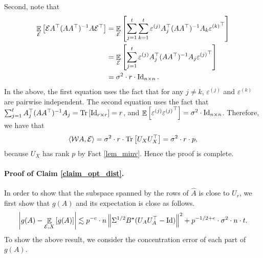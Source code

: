 	Second, note that
	\begin{align*}
			\mathop{\mathbb{E}}_{\mathcal{E}}\left[ \mathcal{E} A^{\top} (AA^{\top})^{-1} A \mathcal{E}^{\top} \right]
		&= \mathop{\mathbb{E}}_{\mathcal{E}}\left[ \sum_{j=1}^t \sum_{k=1}^t \varepsilon^{(j)} A_j^{\top} (AA^{\top})^{-1} A_k {\varepsilon^{(k)}}^{\top} \right] \\
		&= \mathop{\mathbb{E}}_{\mathcal{E}}\left[ \sum_{j=1}^t \varepsilon^{(j)} A_j^{\top} (AA^{\top})^{-1} A_j {\varepsilon^{(j)}}^{\top} \right] \\
		&= \sigma^2 \cdot r \cdot \operatorname{Id}_{n\times n}.
	\end{align*}
	In the above, the first equation uses the fact that for any $j\neq k$, $\varepsilon^{(j)}$ and $\varepsilon^{(k)}$ are pairwise independent.
	The second equation uses the fact that $\sum_{j=1}^t A_j^{\top} (AA^{\top})^{-1} A_j = \operatorname{Tr}\left[\operatorname{Id}_{r\times r}\right] = r$, and $\mathop{\mathbb{E}}\left[ \varepsilon^{(j)} {\varepsilon^{(j)}}^{\top} \right] = \sigma^2 \cdot \operatorname{Id}_{n\times n}$.
	Therefore, we have that
	\begin{align*}
		\langle {\mathcal W} A, \mathcal{E} \rangle = \sigma^2 \cdot r \cdot \operatorname{Tr}\left[U_X U_X^{\top}\right] = \sigma^2 \cdot r \cdot p,
	\end{align*}
	because $U_X$ has rank $p$ by Fact \ref{lem_minv}.
	Hence the proof is complete.

	\paragraph{Proof of Claim \ref{claim_opt_dist}.}
	In order to show that the subspace spanned by the rows of $\hat{A}$ is close to $U_r$, we first show that $g(A)$ and its expectation is close as follows.
	\begin{align}\label{eq_gA_err}
		{\left| {g(A) - \mathop{\mathbb{E}}_{\mathcal{E}, X}\left[ g(A) \right]} \right|} \lesssim p^{-c} \cdot n \left\| \Sigma^{1/2} B^{\star} (U_AU_A^{\top} - \operatorname{Id}) \right\|^2 + p^{-1/2 + e} \cdot \sigma^2 \cdot n \cdot t.
	\end{align}
	To show the above result, we consider the concentration error of each part of $g(A)$.

